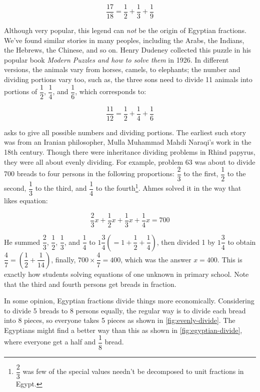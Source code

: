 \documentclass[b5paper]{article}
\begin{document}
\[
\frac{17}{18} = \frac{1}{2} + \frac{1}{3} + \frac{1}{9}
\]

Although very popular, this legend can \emph{not} be the origin of Egyptian fractions. We've found similar stories in many peoples, including the Arabs, the Indians, the Hebrews, the Chinese, and so on. Henry Dudeney collected this puzzle in his popular book \emph{Modern Puzzles and how to solve them} in 1926. In different versions, the animals vary from horses, camels, to elephants; the number and dividing portions vary too, such as, the three sons need to divide 11 animals into portions of $\dfrac{1}{2}$, $\dfrac{1}{4}$, and $\dfrac{1}{6}$, which corresponds to:

\[
\frac{11}{12} = \frac{1}{2} + \frac{1}{4} + \frac{1}{6}
\]

 asks to give all possible numbers and dividing portions. The earliest such story was from an Iranian philosopher, Mulla Muhammad Mahdi Naraqi's work in the 18th century. Though there were inheritance dividing problems in Rhind papyrus, they were all about evenly dividing. For example, problem 63 was about to divide 700 breads to four persons in the following proportions: $\dfrac{2}{3}$ to the first, $\dfrac{1}{2}$ to the second, $\dfrac{1}{3}$ to the third, and $\dfrac{1}{4}$ to the fourth\footnote{$\dfrac{2}{3}$ was few of the special values needn't be decomposed to unit fractions in Egypt.}. Ahmes solved it in the way that likes equation:

\[
\frac{2}{3}x + \frac{1}{2}x + \frac{1}{3}x + \frac{1}{4}x = 700
\]

He summed $\dfrac{2}{3}$, $\dfrac{1}{2}$, $\dfrac{1}{3}$, and $\dfrac{1}{4}$ to $1\dfrac{3}{4} (= 1 + \dfrac{1}{2} + \dfrac{1}{4})$, then divided 1 by $1\dfrac{3}{4}$ to obtain $\dfrac{4}{7} = (\dfrac{1}{2} + \dfrac{1}{14})$, finally, $700 \times \dfrac{4}{7} = 400$, which was the answer $x = 400$. This is exactly how students solving equations of one unknown in primary school. Note that the third and fourth persons get breads in fraction.

In some opinion, Egyptian fractions divide things more economically. Considering to divide 5 breads to 8 persons equally, the regular way is to divide each bread into 8 pieces, so everyone takes 5 pieces as shown in \cref{fig:evenly-divide}. The Egyptians might find a better way than this as shown in \cref{fig:egyptian-divide}, where everyone get a half and $\dfrac{1}{8}$ bread.
\end{document}
